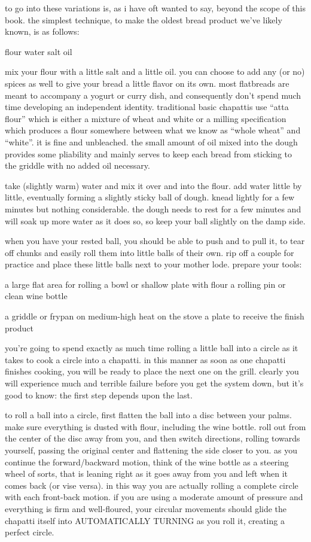to go into these variations is, as i have oft wanted to say, beyond the scope of this book. the simplest technique, to make the oldest bread product we've likely known, is as follows:

flour
water
salt
oil

mix your flour with a little salt and a little oil.
	you can choose to add any (or no) spices as well to give your bread a little flavor on its own. most flatbreads are meant to accompany a yogurt or curry dish, and consequently don't spend much time developing an independent identity. traditional basic chapattis use ``atta flour'' which is either a mixture of wheat and white or a milling specification which produces a flour somewhere between what we know as ``whole wheat'' and ``white''. it is fine and unbleached. the small amount of oil mixed into the dough provides some pliability and mainly serves to keep each bread from sticking to the griddle with no added oil necessary.

take (slightly warm) water and mix it over and into the flour.
	add water little by little, eventually forming a slightly sticky ball of dough. knead lightly for a few minutes but nothing considerable. the dough needs to rest for a few minutes and will soak up more water as it does so, so keep your ball slightly on the damp side.

when you have your rested ball, you should be able to push and to pull it, to tear off chunks and easily roll them into little balls of their own. rip off a couple for practice and place these little balls next to your mother lode. prepare your tools:

a large flat area for rolling
a bowl or shallow plate with flour
a rolling pin or clean wine bottle

a griddle or frypan on medium-high heat on the stove
a plate to receive the finish product

you're going to spend exactly as much time rolling a little ball into a circle as it takes to cook a circle into a chapatti. in this manner as soon as one chapatti finishes cooking, you will be ready to place the next one on the grill. clearly you will experience much and terrible failure before you get the system down, but it's good to know: the first step depends upon the last.

to roll a ball into a circle, first flatten the ball into a disc between your palms. make sure everything is dusted with flour, including the wine bottle. roll out from the center of the disc away from you, and then switch directions, rolling towards yourself, passing the original center and flattening the side closer to you. as you continue the forward/backward motion, think of the wine bottle as a steering wheel of sorts, that is leaning right as it goes away from you and left when it comes back (or vise versa). in this way you are actually rolling a complete circle with each front-back motion. if you are using a moderate amount of pressure and everything is firm and well-floured, your circular movements should glide the chapatti itself into AUTOMATICALLY TURNING as you roll it, creating a perfect circle.

